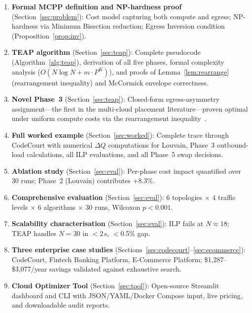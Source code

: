 \documentclass[10pt,journal]{IEEEtran}
\begin{document}
\begin{enumerate}[leftmargin=*]
  \item \textbf{Formal MCPP definition and NP-hardness proof} (Section~\ref{sec:problem}):
    Cost model capturing both compute and egress; NP-hardness via Minimum Bisection
    reduction; Egress Inversion condition (Proposition~\ref{prop:inv}).

  \item \textbf{TEAP algorithm} (Section~\ref{sec:teap}): Complete pseudocode
    (Algorithm~\ref{alg:teap}), derivation of all five phases, formal complexity
    analysis ($O(N\log N + m \cdot P^K)$), and proofs of Lemma~\ref{lem:rearrange}
    (rearrangement inequality) and McCormick envelope correctness.

  \item \textbf{Novel Phase~3} (Section~\ref{sec:teap}): Closed-form
    egress-asymmetry assignment---the first in the multi-cloud placement
    literature---proven optimal under uniform compute costs via the
    rearrangement inequality~\cite{hardy1952}.

  \item \textbf{Full worked example} (Section~\ref{sec:worked}): Complete
    trace through CodeCourt with numerical $\Delta Q$ computations for Louvain,
    Phase~3 outbound-load calculations, all ILP evaluations, and all Phase~5
    swap decisions.

  \item \textbf{Ablation study} (Section~\ref{sec:eval}): Per-phase cost
    impact quantified over 30 runs; Phase~2 (Louvain) contributes +8.3\%.

  \item \textbf{Comprehensive evaluation} (Section~\ref{sec:eval}): 6 topologies
    $\times$ 4 traffic levels $\times$ 6 algorithms $\times$ 30 runs,
    Wilcoxon $p < 0.001$.

  \item \textbf{Scalability characterisation} (Section~\ref{sec:eval}): ILP
    fails at $N \approx 18$; TEAP handles $N = 30$ in $<$2\,s, $<$0.5\% gap.

  \item \textbf{Three enterprise case studies} (Sections~\ref{sec:codecourt}--\ref{sec:ecommerce}): CodeCourt, Fintech Banking Platform, E-Commerce Platform;
    \$1,287--\$3,077/year savings validated against exhaustive search.

  \item \textbf{Cloud Optimizer Tool} (Section~\ref{sec:tool}): Open-source
    Streamlit dashboard and CLI with JSON/YAML/Docker Compose input, live pricing,
    and downloadable audit reports.
\end{enumerate}
\end{document}
